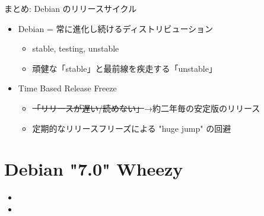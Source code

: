 \begin{frame}{まとめ: Debian のリリースサイクル}

\begin{itemize}
  \item Debian = 常に進化し続けるディストリビューション
  \begin{itemize}
    \item stable, testing, unstable
    \item 頑健な「stable」と最前線を疾走する「unstable」
  \end{itemize}
  \item Time Based Release Freeze
  \begin{itemize}
    \item \sout{「リリースが遅い/読めない」}→約二年毎の安定版のリリース
    \item 定期的なリリースフリーズによる "huge jump" の回避
  \end{itemize}
\end{itemize}

\end{frame}


\begin{frame}

\begin{center}
\end{center}

\end{frame}

\section{Debian "7.0" Wheezy}

{

\begin{frame}[plain]%
\end{frame}
}

{
\begin{frame}[plain]

\huge{
\begin{itemize}
  \item {}
  \item \color{red}{リリースに向けたバグ（RCバグ）潰しが進行中}
\end{itemize}
}
\end{frame}
}

